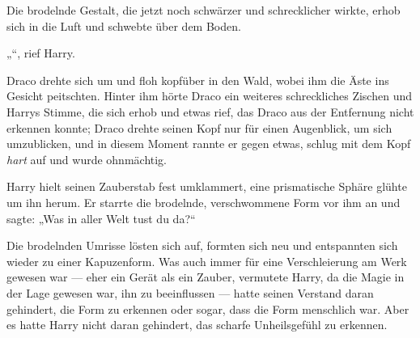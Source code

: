 \begin{em}
Die brodelnde Gestalt, die jetzt noch schwärzer und schrecklicher wirkte, erhob sich in die Luft und schwebte über dem Boden.

„“, rief Harry.

Draco drehte sich um und floh kopfüber in den Wald, wobei ihm die Äste ins Gesicht peitschten. Hinter ihm hörte Draco ein weiteres schreckliches Zischen und Harrys Stimme, die sich erhob und etwas rief, das Draco aus der Entfernung nicht erkennen konnte; Draco drehte seinen Kopf nur für einen Augenblick, um sich umzublicken, und in diesem Moment rannte er gegen etwas, schlug mit dem Kopf \emph{hart} auf und wurde ohnmächtig.
\end{em}

\later

Harry hielt seinen Zauberstab fest umklammert, eine prismatische Sphäre glühte um ihn herum. Er starrte die brodelnde, verschwommene Form vor ihm an und sagte:
„Was in aller Welt tust du da?“

Die brodelnden Umrisse lösten sich auf, formten sich neu und entspannten sich wieder zu einer Kapuzenform. Was auch immer für eine Verschleierung am Werk gewesen war — eher ein Gerät als ein Zauber, vermutete Harry, da die Magie in der Lage gewesen war, ihn zu beeinflussen — hatte seinen Verstand daran gehindert, die Form zu erkennen oder sogar, dass die Form menschlich war. Aber es hatte Harry nicht daran gehindert, das scharfe Unheilsgefühl zu erkennen.

